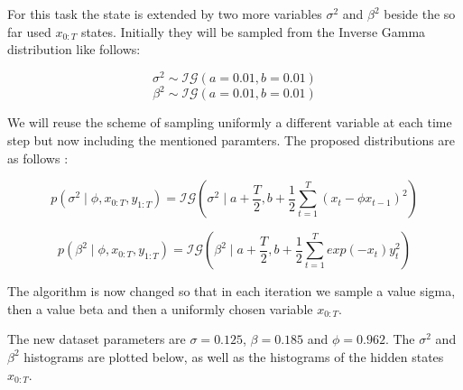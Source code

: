 \documentclass[]{article}
\begin{document}
	For this task the state is extended by two more variables $\sigma^2$ and $\beta^2$ beside the so far used $x_{0:T}$ states. Initially they will be sampled from the Inverse Gamma distribution like follows:
	
	$$ \sigma^2 \sim \mathcal{IG}(a = 0.01, b = 0.01)$$
	$$ \beta^2 \sim \mathcal{IG}(a = 0.01, b = 0.01)$$
	
	
	We will reuse the scheme of sampling uniformly a different variable at each time step but now including the mentioned paramters. The proposed distributions are as follows :
	
	$$ p(\sigma^2 \mid \phi, x_{0:T}, y_{1:T} ) = \mathcal{IG} \left( \sigma^2 \mid a+\frac{T}{2}, b + \frac{1}{2} \sum_{t=1}^T (x_t - \phi x_{t-1})^2 \right) $$
	
	$$ p(\beta^2 \mid \phi, x_{0:T}, y_{1:T} ) = \mathcal{IG} \left( \beta^2 \mid a+\frac{T}{2}, b + \frac{1}{2} \sum_{t=1}^T exp(-x_t)y_t^2 \right) $$
	
	The algorithm is now changed so that in each iteration we sample a value sigma, then a value beta and then a uniformly chosen variable $x_{0:T}$. 
	
	The new dataset parameters are $\sigma = 0.125$, $\beta = 0.185 $ and $\phi=0.962$. The $\sigma^2$ and $\beta^2$ histograms are plotted below, as well as the histograms of the hidden states $x_{0:T}$.
	
\end{document}
